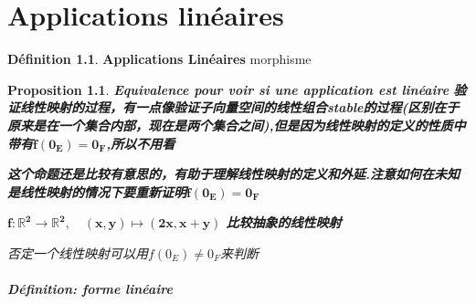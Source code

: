 \documentclass[12pt]{book}
\theoremstyle{definition}\newtheorem{dfn}{Définition}[chapter]
\theoremstyle{plain}\newtheorem{thm}{Théorème}[chapter]
\theoremstyle{plain}\newtheorem{prp}{Proposition}[chapter]
\theoremstyle{plain}\newtheorem{lem}{\bf Lemme}[chapter]
\theoremstyle{plain}\newtheorem{axm}{\bf Axiome}[chapter]
\theoremstyle{plain}\newtheorem{lmm}{\bf Lemme}[chapter]
\theoremstyle{plain}\newtheorem{cor}{\bf Corollaire}[chapter]
\theoremstyle{remark}\newtheorem{rem}{Remarque}[chapter]
\begin{document}
\chapter{Applications linéaires}
\begin{dfn}{\bf Applications Linéaires}
morphisme
\end{dfn}

\begin{prp}
{\bf Equivalence pour voir si une application  est linéaire}
\textbf{验证线性映射的过程，有一点像验证子向量空间的线性组合stable的过程(区别在于原来是在一个集合内部，现在是两个集合之间),但是因为线性映射的定义的性质中带有$\mathbf{f(0_E)=0_F}$,所以不用看}

\textbf{这个命题还是比较有意思的，有助于理解线性映射的定义和外延.注意如何在未知是线性映射的情况下要重新证明$\mathbf{f(0_E)=0_F}$}

$\mathbf{f:\mathbb{R}^2\longrightarrow \mathbb{R}^2,\quad (x,y)\longmapsto (2x,x+y)} $
\textbf{比较抽象的线性映射}

否定一个线性映射可以用$f(0_E)\neq 0_F$来判断
\end{prp}

\paragraph{Définition: forme linéaire}
\end{document}
